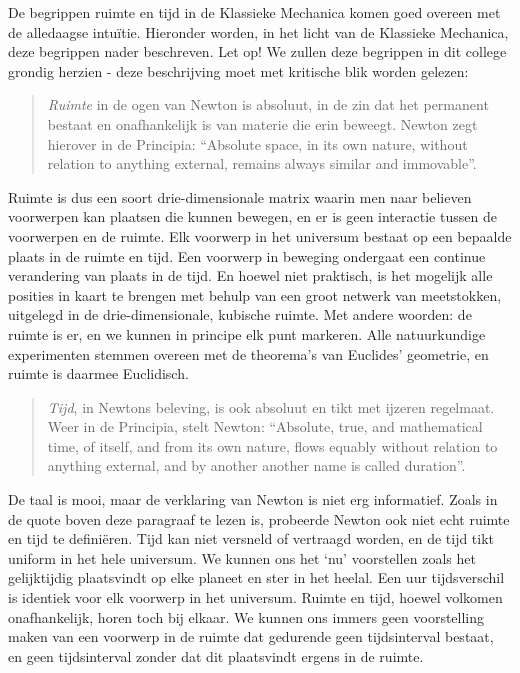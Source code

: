 De begrippen ruimte en tijd in de Klassieke Mechanica komen goed
overeen met de alledaagse intu\"itie. Hieronder worden, in het licht
van de Klassieke Mechanica, deze begrippen nader beschreven. Let op!
We zullen deze begrippen in dit college grondig herzien - deze
beschrijving moet met kritische blik worden gelezen:
\begin{verse}
{\it Ruimte} in de ogen van Newton is absoluut, in de zin dat het
permanent bestaat en onafhankelijk is van materie die erin
beweegt. Newton zegt hierover in de Principia: ``Absolute space, in
its own nature, without relation to anything external, remains always
similar and immovable''.
\end{verse}
Ruimte is dus een soort drie-dimensionale matrix waarin men naar
believen voorwerpen kan plaatsen die kunnen bewegen, en er is geen
interactie tussen de voorwerpen en de ruimte. Elk voorwerp in het
universum bestaat op een bepaalde plaats in de ruimte en tijd. Een
voorwerp in beweging ondergaat een continue verandering van plaats in
de tijd. En hoewel niet praktisch, is het mogelijk alle posities in
kaart te brengen met behulp van een groot netwerk van meetstokken,
uitgelegd in de drie-dimensionale, kubische ruimte. Met andere woorden:
de ruimte is er, en we kunnen in principe elk punt markeren. Alle
natuurkundige experimenten stemmen overeen met de theorema's van
Euclides' geometrie, en ruimte is daarmee Euclidisch.
\begin{verse}
{\it Tijd}, in Newtons beleving, is ook absoluut en tikt met ijzeren
regelmaat. Weer in de Principia, stelt Newton: ``Absolute, true, and
mathematical time, of itself, and from its own nature, flows equably
without relation to anything external, and by another another name is
called duration''. 
\end{verse}
De taal is mooi, maar de verklaring van Newton is niet erg
informatief. Zoals in de quote boven deze paragraaf te lezen is,
probeerde Newton ook niet echt ruimte en tijd te defini\"eren.  Tijd kan
niet versneld of vertraagd worden, en de tijd tikt uniform in het
hele universum.  We kunnen ons het `nu' voorstellen zoals het
gelijktijdig plaatsvindt op elke planeet en ster in het heelal. Een uur
tijdsverschil is identiek voor elk voorwerp in
het universum. Ruimte en tijd, hoewel volkomen onafhankelijk, horen toch bij
elkaar. We kunnen ons immers geen voorstelling maken van een voorwerp
in de ruimte dat gedurende geen tijdsinterval bestaat, en geen
tijdsinterval zonder dat dit plaatsvindt ergens in de ruimte.


